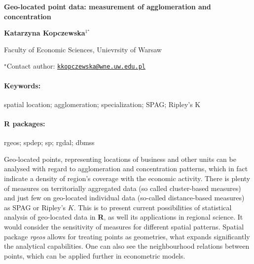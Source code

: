 \documentclass[11pt, a4paper]{article}
\renewcommand{\title}[1]{\begin{center}{\bf \LARGE #1}\end{center}}
\newcommand{\keywords}{\paragraph{Keywords:}}
\newcommand{\packages}{\paragraph{R packages:}}
\begin{document}
\pagestyle{empty}

\title{Geo-located point data: measurement of agglomeration and concentration}

\begin{center}
  {\bf Katarzyna Kopczewska$^{1^\star}$}
\end{center}

\vskip 0.3cm

\begin{affiliations}
\begin{enumerate}
\begin{minipage}{0.915\textwidth}
\centering
\item Faculty of Economic Sciences, Unievrsity of Warsaw \\[-2pt]
\end{minipage}
\end{enumerate}
$^\star$Contact author: \href{mailto:kkopczewska@wne.uw.edu.pl}{\nolinkurl{kkopczewska@wne.uw.edu.pl}}\\
\end{affiliations}

\vskip 0.5cm

\begin{minipage}{0.915\textwidth}
\keywords spatial location; agglomeration; specialization; SPAG; Ripley's K
\packages rgeos; spdep; sp; rgdal; dbmss
\end{minipage}

\vskip 0.8cm

Geo-located points, representing locations of business and other units
can be analysed with regard to agglomeration and concentration patterns,
which in fact indicate a density of region's coverage with the economic
activity. There is plenty of measures on territorially aggregated data
(so called cluster-based measures) and just few on geo-located
individual data (so-called distance-based measures) as SPAG or Ripley's
\(K\). This is to present current possibilities of statistical analysis
of geo-located data in \textbf{R}, as well its applications in regional
science. It would consider the sensitivity of measures for different
spatial patterns. Spatial package \emph{rgeos} allows for treating
points as geometries, what expands significantly the analytical
capabilities. One can also see the neighbourhood relations between
points, which can be applied further in econometric models.
\end{document}

